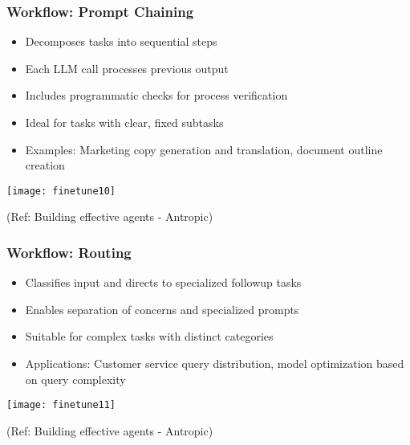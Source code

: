 \begin{frame}[fragile]\frametitle{Workflow: Prompt Chaining}
    \begin{itemize}
        \item Decomposes tasks into sequential steps
        \item Each LLM call processes previous output
        \item Includes programmatic checks for process verification
        \item Ideal for tasks with clear, fixed subtasks
        \item Examples: Marketing copy generation and translation, document outline creation
    \end{itemize}
	
	\begin{center}
	\texttt{[image: finetune10]}
	\end{center}

	{\tiny (Ref: Building effective agents - Antropic)}	
\end{frame}

\begin{frame}[fragile]\frametitle{Workflow: Routing}
    \begin{itemize}
        \item Classifies input and directs to specialized followup tasks
        \item Enables separation of concerns and specialized prompts
        \item Suitable for complex tasks with distinct categories
        \item Applications: Customer service query distribution, model optimization based on query complexity
    \end{itemize}
	
	\begin{center}
	\texttt{[image: finetune11]}
	\end{center}

	{\tiny (Ref: Building effective agents - Antropic)}		
\end{frame}

